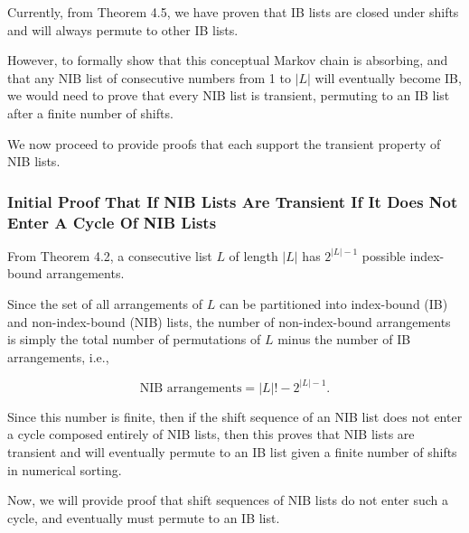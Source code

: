\documentclass[12pt]{article}
\begin{document}

Currently, from Theorem 4.5, we have proven that IB lists are closed under shifts and will always permute to other IB lists. 

However, to formally show that this conceptual Markov chain is absorbing, and that any NIB list of consecutive numbers from 1 to $|L|$ will eventually become IB, we would need to prove that every NIB list is transient, permuting to an IB list after a finite number of shifts.

We now proceed to provide proofs that each support the transient property of NIB lists.

\subsubsection{Initial Proof That If NIB Lists Are Transient If It Does Not Enter A Cycle Of NIB Lists}

From Theorem 4.2, a consecutive list $L$ of length $|L|$ has $2^{|L|-1}$ possible index-bound arrangements. 

Since the set of all arrangements of $L$ can be partitioned into index-bound (IB) and non-index-bound (NIB) lists, the number of non-index-bound arrangements is simply the total number of permutations of $L$ minus the number of IB arrangements, i.e.,

\[
\text{NIB arrangements} = |L|! - 2^{|L|-1}.
\]

Since this number is finite, then if the shift sequence of an NIB list does not enter a cycle composed entirely of NIB lists, then this proves that NIB lists are transient and will eventually permute to an IB list given a finite number of shifts in numerical sorting.

Now, we will provide proof that shift sequences of NIB lists do not enter such a cycle, and eventually must permute to an IB list.
\end{document}
